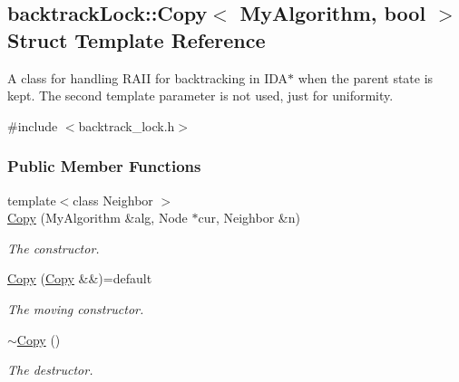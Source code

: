 \hypertarget{structbacktrackLock_1_1Copy}{}\subsection{backtrack\+Lock\+:\+:Copy$<$ My\+Algorithm, bool $>$ Struct Template Reference}
\label{structbacktrackLock_1_1Copy}


A class for handling R\+A\+II for backtracking in I\+D\+A$\ast$ when the parent state is kept. The second template parameter is not used, just for uniformity.  




{\ttfamily \#include $<$backtrack\+\_\+lock.\+h$>$}

\subsubsection*{Public Member Functions}
\begin{DoxyCompactItemize}
\item 
{\footnotesize template$<$class Neighbor $>$ }\\\hyperlink{structbacktrackLock_1_1Copy_a6bcb87c21e4c2cf6d66d2baac51067c8}{Copy} (My\+Algorithm \&alg, Node $\ast$cur, Neighbor \&n)
\begin{DoxyCompactList}\small\item\em The constructor. \end{DoxyCompactList}\item 
\hyperlink{structbacktrackLock_1_1Copy_a0727da2f9e00ef1335f9f795f3924eb2}{Copy} (\hyperlink{structbacktrackLock_1_1Copy}{Copy} \&\&)=default\hypertarget{structbacktrackLock_1_1Copy_a0727da2f9e00ef1335f9f795f3924eb2}{}\label{structbacktrackLock_1_1Copy_a0727da2f9e00ef1335f9f795f3924eb2}

\begin{DoxyCompactList}\small\item\em The moving constructor. \end{DoxyCompactList}\item 
\hyperlink{structbacktrackLock_1_1Copy_aeac2bb6f22a261f9e5af9d2af698ea92}{$\sim$\+Copy} ()\hypertarget{structbacktrackLock_1_1Copy_aeac2bb6f22a261f9e5af9d2af698ea92}{}\label{structbacktrackLock_1_1Copy_aeac2bb6f22a261f9e5af9d2af698ea92}

\begin{DoxyCompactList}\small\item\em The destructor. \end{DoxyCompactList}\end{DoxyCompactItemize}

